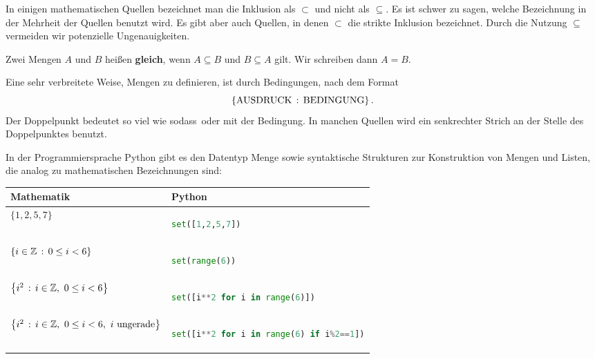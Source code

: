 \begin{bem}
In einigen mathematischen Quellen bezeichnet man die Inklusion als $ \subset $ und nicht als $ \subseteq $. Es ist schwer zu sagen, welche Bezeichnung in der Mehrheit der Quellen benutzt wird. Es gibt aber auch Quellen, in denen $ \subset $ die strikte Inklusion bezeichnet. Durch die Nutzung $\subseteq$ vermeiden wir potenzielle Ungenauigkeiten. %
\end{bem} 

\begin{defn}
	 Zwei Mengen $ A $ und $ B $ heißen \textbf{gleich}, wenn $ A \subseteq B $ und $ B \subseteq A $ gilt. Wir schreiben dann $A = B$.
\end{defn} 


\begin{bem}
Eine sehr verbreitete Weise, Mengen zu definieren, ist durch Bedingungen, nach dem Format 
\[
 \left\{  \text{AUSDRUCK}  \,:\, \text{BEDINGUNG} \right\}. 
\] Der Doppelpunkt bedeutet so viel wie \glqq sodass\grqq\ oder \glqq mit der Bedingung\grqq. In manchen Quellen wird ein senkrechter Strich an der Stelle des Doppelpunktes benutzt. 
\end{bem} 

\begin{bem} In der Programmiersprache Python gibt es den Datentyp Menge sowie syntaktische Strukturen zur Konstruktion von Mengen und Listen, die analog zu mathematischen Bezeichnungen sind: 
\begin{center}
	\small 
	\begin{tabular}{l|l}
		Mathematik & Python 
\\ \hline	$\{1,2,5,7\}$ 
& \begin{lstlisting}[language=Python,backgroundcolor=\color{white}]
set([1,2,5,7])
\end{lstlisting} 
\\ $\left\{ i \in \mathbb{Z} \,:\, 0 \le i < 6 \right\}$ & 
\begin{lstlisting}[language=Python,backgroundcolor=\color{white}]
set(range(6))
\end{lstlisting} 
\\ $\left\{ i ^2 \,:\, i \in \mathbb{Z}, \ 0 \le i < 6 \right\}$
&  
\begin{lstlisting}[language=Python,backgroundcolor=\color{white}]
set([i**2 for i in range(6)])
\end{lstlisting} 
\\ $\left\{ i^2 \,:\, i \in \mathbb{Z}, \ 0 \le i < 6, \ i \ \text{ungerade} \right\}$
& 
\begin{lstlisting}[language=Python,backgroundcolor=\color{white}]
set([i**2 for i in range(6) if i%2==1])
\end{lstlisting} 
\end{tabular}
\end{center}  
\end{bem} 

